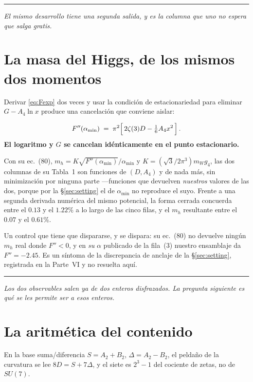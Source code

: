 \documentclass[11pt,a4paper]{article}
\newcommand{\su}[1]{SU(#1)}
\newcommand{\amin}{\alpha_{\min}}
\newcommand{\bridge}[1]{\par\medskip\noindent
  \textcolor{hdrblue!45}{\rule{2.2cm}{0.6pt}}\;\;\parbox[t]{0.84\textwidth}{\small\itshape
  \textcolor{hdrblue!85}{#1}}\par\medskip}
\newenvironment{keyeq}
  {\begin{center}\setlength{\fboxsep}{9pt}\setlength{\fboxrule}{0.8pt}%
   \begin{lrbox}{\keyeqbox}\begin{minipage}{0.88\textwidth}}
  {\end{minipage}\end{lrbox}%
   \fcolorbox{hdrblue!55}{hdrblue!6}{\usebox{\keyeqbox}}\end{center}}
\begin{document}
\bridge{El mismo desarrollo tiene una segunda salida, y es la columna que uno no espera que salga
gratis.}

\section{La masa del Higgs, de los mismos dos momentos}\label{sec:mh}

Derivar \eqref{eq:Fexp} dos veces y usar la condición de estacionariedad para eliminar
$G-A_4\ln x$ produce una cancelación que conviene aislar:
\begin{keyeq}
\begin{equation}\label{eq:fpp}
  F''(\amin)\;=\;\pi^2\Bigl[\,2\zeta(3)D-\tfrac16 A_4 x^2\,\Bigr]\,.
\end{equation}
\textbf{El logaritmo y $G$ se cancelan idénticamente en el punto estacionario.}
\end{keyeq}

\noindent Con su ec.~(80), $m_h=K\sqrt{F''(\amin)}/\amin$ y $K=(\sqrt3/2\pi^3)m_W g_4$, las dos
columnas de su Tabla~1 son funciones de $(D,A_4)$ y de nada más, sin minimización por ninguna
parte ---funciones que devuelven \emph{nuestros} valores de las dos, porque por la
\S\ref{sec:setting} el de $\amin$ no reproduce el suyo.
Frente a una segunda derivada numérica del mismo potencial, la forma cerrada concuerda entre el
$0.13$ y el $1.22\%$ a lo largo de las cinco filas, y el $m_h$ resultante entre el $0.07$ y el
$0.61\%$.

Un control que tiene que dispararse, y se dispara: su ec.~(80) no devuelve ningún $m_h$ real donde
$F''<0$, y en \emph{su} $\alpha$ publicado de la fila~(3) nuestro ensamblaje da $F''=-2.45$. Es un
síntoma de la discrepancia de anclaje de la \S\ref{sec:setting}, registrada en la Parte~VI y no
resuelta aquí.

\bridge{Los dos observables salen ya de dos enteros disfrazados. La pregunta siguiente es qué se les
permite ser a esos enteros.}

\section{La aritmética del contenido}\label{sec:arith}

En la base suma/diferencia $S=A_2+B_2$, $\Delta=A_2-B_2$, el peldaño de la curvatura se lee
$8D=S+7\Delta$, y el siete es $2^3-1$ del cociente de zetas, no de $\su7$.
\end{document}
